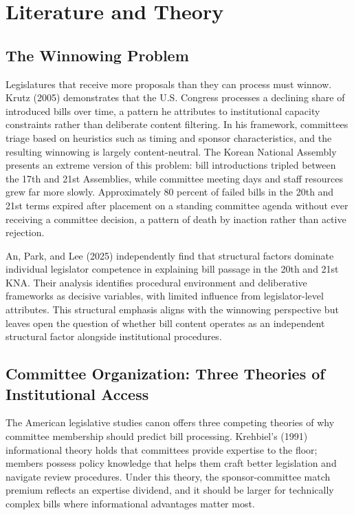 \documentclass[11pt]{article}
\begin{document}
\section{Literature and Theory}\label{sec:lit}

\subsection{The Winnowing Problem}\label{sec:winnowing}

Legislatures that receive more proposals than they can process must winnow. Krutz (2005) demonstrates that the U.S. Congress processes a declining share of introduced bills over time, a pattern he attributes to institutional capacity constraints rather than deliberate content filtering. In his framework, committees triage based on heuristics such as timing and sponsor characteristics, and the resulting winnowing is largely content-neutral. The Korean National Assembly presents an extreme version of this problem: bill introductions tripled between the 17th and 21st Assemblies, while committee meeting days and staff resources grew far more slowly. Approximately 80 percent of failed bills in the 20th and 21st terms expired after placement on a standing committee agenda without ever receiving a committee decision, a pattern of death by inaction rather than active rejection.

An, Park, and Lee (2025) independently find that structural factors dominate individual legislator competence in explaining bill passage in the 20th and 21st KNA. Their analysis identifies procedural environment and deliberative frameworks as decisive variables, with limited influence from legislator-level attributes. This structural emphasis aligns with the winnowing perspective but leaves open the question of whether bill content operates as an independent structural factor alongside institutional procedures.

\subsection{Committee Organization: Three Theories of Institutional Access}\label{sec:committee}

The American legislative studies canon offers three competing theories of why committee membership should predict bill processing. Krehbiel's (1991) informational theory holds that committees provide expertise to the floor; members possess policy knowledge that helps them craft better legislation and navigate review procedures. Under this theory, the sponsor-committee match premium reflects an expertise dividend, and it should be larger for technically complex bills where informational advantages matter most.
\end{document}
